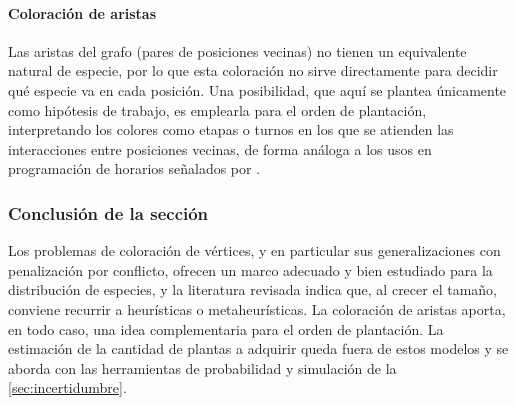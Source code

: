 \paragraph{Coloración de aristas} Las aristas del grafo (pares de posiciones vecinas) no tienen un equivalente natural de especie, por lo que esta coloración no sirve directamente para decidir qué especie va en cada posición. Una posibilidad, que aquí se plantea únicamente como hipótesis de trabajo, es emplearla para el orden de plantación, interpretando los colores como etapas o turnos en los que se atienden las interacciones entre posiciones vecinas, de forma análoga a los usos en programación de horarios señalados por \textcite{dewerra2015}.

\subsubsection{Conclusión de la sección}

Los problemas de coloración de vértices, y en particular sus generalizaciones con penalización por conflicto, ofrecen un marco adecuado y bien estudiado para la distribución de especies, y la literatura revisada indica que, al crecer el tamaño, conviene recurrir a heurísticas o metaheurísticas. La coloración de aristas aporta, en todo caso, una idea complementaria para el orden de plantación. La estimación de la cantidad de plantas a adquirir queda fuera de estos modelos y se aborda con las herramientas de probabilidad y simulación de la \cref{sec:incertidumbre}.
